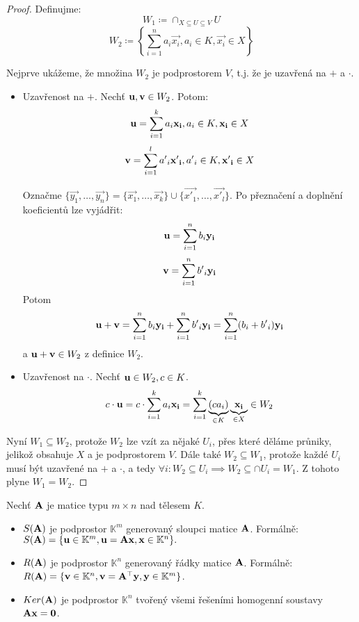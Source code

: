 \begin{proof}
    Definujme:
    $$W_1 \coloneqq \cap_{X \subseteq U \subseteq V} U$$
    $$W_2 \coloneqq \left\{ \sum_{i=1}^{n} a_i \vec{x_i}, a_i \in K, 
    \vec{x_i} \in X \right\}$$

    Nejprve ukážeme, že množina $W_2$ je podprostorem $V$, t.j. že je 
    uzavřená na $+$ a $\cdot$. 
    \begin{itemize}
        \item Uzavřenost na $+$. Nechť $\mathbf{u},\mathbf{v} \in W_2$. Potom:
            $$ \mathbf{u} = \sum_{i=1}^{k}a_i \mathbf{x_i}, a_i \in K, \mathbf{x_i} \in X$$
            $$ \mathbf{v} = \sum_{i=1}^{l}{a'}_i \mathbf{{x'}_i}, {a'}_i \in K, 
            \mathbf{{x'}_i} \in X$$

            Označme $\{\vec{y_1}, \dots, \vec{y_n}\} = \{\vec{x_1}, \dots, 
            \vec{x_k}\} \cup \{\vec{{x'}_1}, \dots, \vec{{x'}_l}\}$. 
            Po přeznačení a doplnění koeficientů lze vyjádřit:
            $$ \mathbf{u} = \sum_{i=1}^{n} b_i \mathbf{y_i}$$
            $$ \mathbf{v} = \sum_{i =1}^{n} {b'}_i \mathbf{y_i}$$
            Potom
            $$ \mathbf{u} + \mathbf{v} = \sum_{i=1}^{n} b_i \mathbf{y_i} + \sum_{i=1}^{n} 
            {b'}_i \mathbf{y_i} = \sum_{i=1}^{n} (b_i + {b'}_i)\mathbf{y_i}$$
            a $\mathbf{u} + \mathbf{v} \in W_2$ z definice $W_2$.

        \item Uzavřenost na $\cdot$. Nechť $\mathbf{u} \in W_2, c \in K$.
            $$c \cdot \mathbf{u} = c \cdot \sum_{i=1}^{k} a_i \mathbf{x_i} = 
            \sum_{i = 1}^{k} \underbrace{(ca_i)}_{\in K} 
            \underbrace{\mathbf{x_i}}_{\in X} \in W_2$$
    \end{itemize}

    Nyní $W_1 \subseteq W_2$, protože $W_2$ lze vzít za nějaké $U_i$, přes
    které děláme průniky, jelikož obsahuje $X$ a je podprostorem $V$. Dále také
    $W_2 \subseteq W_1$, protože každé $U_i$ musí být uzavřené na $+$ a 
    $\cdot$, a tedy $\forall i: W_2 \subseteq U_i \implies W_2 \subseteq \cap U_i = W_1$. 
    Z tohoto plyne $W_1 = W_2$.
\end{proof}

\begin{definition}
    Nechť $\mathbf{A}$ je matice typu $m \times n$ nad tělesem $K$.
    \begin{itemize}
        \item {} $S(\mathbf{A})$ je podprostor 
            $\mathbb{K}^m$ generovaný sloupci matice $\mathbf{A}$. Formálně:
            $S(\mathbf{A}) = \{\mathbf{u} \in \mathbb{K}^m, \mathbf{u} = \mathbf{A}\mathbf{x},
            \mathbf{x} \in \mathbb{K}^n \}.$
        \item {} $R(\mathbf{A})$ je podprostor 
            $\mathbb{K}^n$ generovaný řádky matice $\mathbf{A}$. Formálně:
            $R(\mathbf{A}) = \{\mathbf{v} \in \mathbb{K}^n, \mathbf{v} = \mathbf{A}^{\top}\mathbf{y}, 
            \mathbf{y} \in \mathbb{K}^m \}$.
        \item {} $Ker(\mathbf{A})$ je podprostor
            $\mathbb{K}^n$ tvořený všemi řešeními homogenní soustavy
            $\mathbf{A}\mathbf{x} = \mathbf{0}$.
    \end{itemize}
\end{definition}

